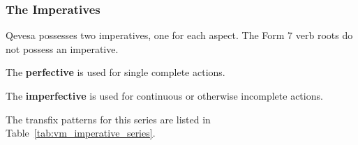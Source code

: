 \documentclass[grammar]{subfiles}
\begin{document}
  \newpage
  \subsubsection{The Imperatives}
  \label{sssec:vm_imperatives}
  
  Qevesa possesses two imperatives, one for each aspect.  The Form 7 verb roots do not possess an imperative. 

  \begin{itemize*}
    \item The \textbf{perfective} is used for single complete actions. 
    \item The \textbf{imperfective} is used for continuous or otherwise incomplete actions. 
  \end{itemize*}

  The transfix patterns for this series are listed in Table~\ref{tab:vm_imperative_series}. 
\end{document}
